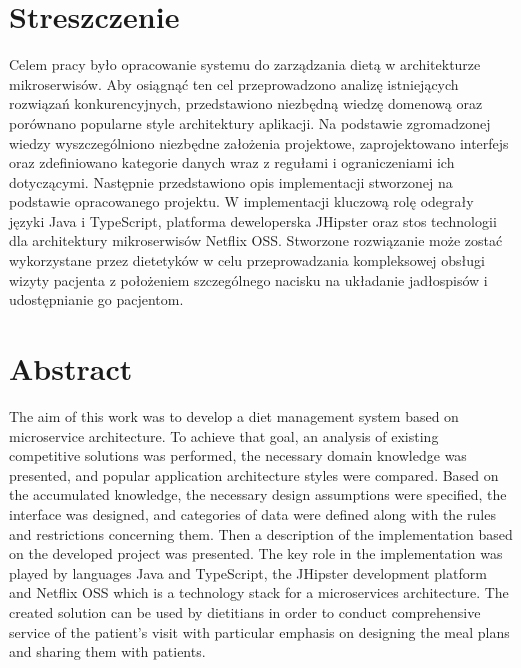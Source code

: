 \chapter*{Streszczenie} %
Celem pracy było opracowanie systemu do zarządzania dietą w architekturze mikroserwisów.
Aby osiągnąć ten cel przeprowadzono analizę istniejących rozwiązań konkurencyjnych, przedstawiono niezbędną wiedzę domenową oraz porównano popularne style architektury aplikacji.
Na podstawie zgromadzonej wiedzy wyszczególniono niezbędne założenia projektowe, zaprojektowano interfejs oraz zdefiniowano kategorie danych wraz z regułami i ograniczeniami ich dotyczącymi.
Następnie przedstawiono opis implementacji stworzonej na podstawie opracowanego projektu.
W implementacji kluczową rolę odegrały języki Java\cite{tech:java} i TypeScript\cite{tech:typescript}, platforma deweloperska JHipster\cite{tech:jhipster} oraz stos technologii dla architektury mikroserwisów Netflix OSS\cite{tech:netflix-oss}.
Stworzone rozwiązanie może zostać wykorzystane przez dietetyków w celu przeprowadzania kompleksowej obsługi wizyty pacjenta z położeniem szczególnego nacisku na układanie jadłospisów i udostępnianie go pacjentom.


\begingroup
\renewcommand{\cleardoublepage}{}
\renewcommand{\clearpage}{}
\chapter*{Abstract} %
The aim of this work was to develop a diet management system based on microservice architecture.
To achieve that goal, an analysis of existing competitive solutions was performed, the necessary domain knowledge was presented, and popular application architecture styles were compared.
Based on the accumulated knowledge, the necessary design assumptions were specified, the interface was designed, and categories of data were defined along with the rules and restrictions concerning them.
Then a description of the implementation based on the developed project was presented.
The key role in the implementation was played by languages Java\cite{tech:java} and TypeScript\cite{tech:typescript}, the JHipster\cite{tech:jhipster} development platform and Netflix OSS\cite{tech:netflix-oss} which is a technology stack for a microservices architecture.
The created solution can be used by dietitians in order to conduct comprehensive service of the patient's visit with particular emphasis on designing the meal plans and sharing them with patients.
\endgroup
{}
